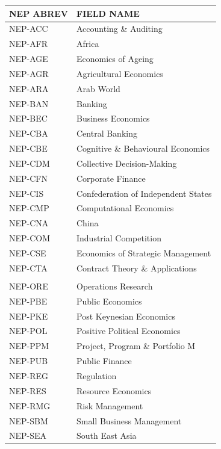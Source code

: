 \begin{table}[!ht]
    \centering
    {\footnotesize
    \begin{tabular}{ll}
        \hline
        NEP ABREV & FIELD NAME\\ \hline \hline
        NEP-ACC   & Accounting \& Auditing\\
        NEP-AFR   & Africa\\
        NEP-AGE   & Economics of Ageing\\
        NEP-AGR   & Agricultural Economics\\
        NEP-ARA   & Arab World\\
        NEP-BAN   & Banking\\
        NEP-BEC   & Business Economics\\
        NEP-CBA   & Central Banking\\
        NEP-CBE   & Cognitive \& Behavioural Economics\\
        NEP-CDM   & Collective Decision-Making\\
        NEP-CFN   & Corporate Finance\\
        NEP-CIS   & Confederation of Independent States\\
        NEP-CMP   & Computational Economics\\
        NEP-CNA   & China\\
        NEP-COM   & Industrial Competition\\
        NEP-CSE   & Economics of Strategic Management\\
        NEP-CTA   & Contract Theory \& Applications\\
                  &\\
        NEP-ORE   & Operations Research\\
        NEP-PBE   & Public Economics\\
        NEP-PKE   & Post Keynesian Economics\\
        NEP-POL   & Positive Political Economics\\
        NEP-PPM   & Project, Program \& Portfolio M\\
        NEP-PUB   & Public Finance\\
        NEP-REG   & Regulation\\
        NEP-RES   & Resource Economics\\
        NEP-RMG   & Risk Management\\
        NEP-SBM   & Small Business Management\\
        NEP-SEA   & South East Asia\\

\end{tabular}}
\end{table}
